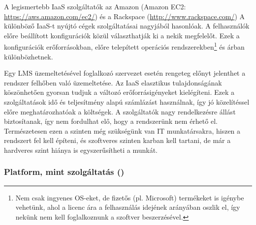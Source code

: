 A legismertebb IaaS szolgáltatók az Amazon (Amazon EC2: \href{https://aws.amazon.com/ec2/}{https://aws.amazon.com/ec2/}) és a Rackspace (\href{http://www.rackspace.com/}{http://www.rackspace.com/}) A különböző IaaS-t nyújtó cégek szolgáltatásai nagyjából hasonlóak. A felhasználók előre beállított konfigurációk közül választhatják ki a nekik megfelelőt. Ezek a konfigurációk erőforrásokban, előre telepített operációs rendszerekben\footnote{Nem csak ingyenes OS-eket, de fizetős (pl. Microsoft) termékeket is igénybe vehetünk, ahol a licenc ára a felhasználás idejének arányában oszlik el, így nekünk nem kell foglalkoznunk a szoftver beszerzésével.} és árban különbözhetnek.

Egy LMS üzemeltetésével foglalkozó szervezet esetén rengeteg előnyt jelenthet a rendszer felhőben való üzemeltetése. Az IaaS elasztikus tulajdonságának köszönhetően gyorsan tudjuk a változó erőforrásigényeket kielégíteni. Ezek a szolgáltatások idő és teljesítmény alapú számlázást használnak, így jó közelítéssel előre meghatározhatóak a költségek. A szolgáltatók nagy rendelkezésre állást biztosítanak, így nem fordulhat elő, hogy a rendszerünk nem érhető el. Természetesen ezen a szinten még szükségünk van IT munkatársakra, hiszen a rendszert fel kell építeni, és szoftveres szinten karban kell tartani, de már a hardveres szint hiánya is egyszerűsítheti a munkát.


\subsubsection{Platform, mint szolgáltatás ()}

